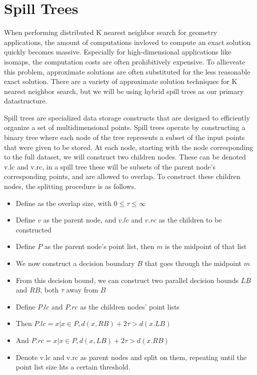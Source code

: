 \chapter{Spill Trees}

\vspace{5 mm}
\noindent
When performing distributed K nearest neighbor search for geometry applications, 
the amount of computations invloved to compute an exact solution quickly 
becomes massive.  Especially for high-dimensional applications like isomaps, 
the computation costs are often prohibitively expensive.  To allieveate this 
problem, approximate solutions are often substituted for the less reasonable 
exact solution.  There are a variety of approximate solution techniques for K 
nearest neighbor search, but we will be using hybrid spill trees as our primary 
datastructure. 

\vspace{5 mm}
\noindent
Spill trees are specialized data storage constructs that are designed to 
efficiently organize a set of multidimensional points.  Spill trees operate by 
constructing a binary tree where each node of the tree represents a subset of 
the input points that were given to be stored.  At each node, starting with the 
node corresponding to the full dataset, we will construct two children nodes. 
These can be denoted v.lc and v.rc, in a spill tree these will be subsets of 
the parent node's corresponding points, and are allowed to overlap.  To 
construct these children nodes, the splitting procedure is as follows.

\begin{itemize}
  \item Define \tau as the overlap size, with $0 \le \tau \le \infty$
  \item Define $v$ as the parent node, and $v.lc$ and $v.rc$ as the children to be constructed
  \item Define $P$ as the parent node's point list, then $m$ is the midpoint of that list
  \item We now construct a decision boundary $B$ that goes through the midpoint $m$
  \item From this decision bound, we can construct two parallel decision bounds $LB$ and $RB$, both $\tau$ away from $B$
  \item Define $P.lc$ and $P.rc$ as the children nodes' point lists
  \item Then $P.lc = {x|x \in P, d(x,RB) +2\tau > d(x.LB)}$
  \item And $P.rc = {x|x \in P, d(x,LB) +2\tau > d(x.RB)}$
  \item Denote v.lc and v.rc as parent nodes and split on them, repeating until the point list size hts a certain threshold.
\end{itemize}

